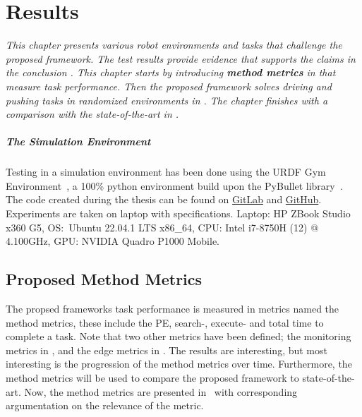 \chapter{Results}%
\label{chap:results}
\textit{This chapter presents various robot environments and tasks that challenge the proposed framework. The test results provide evidence that supports the claims in the conclusion . This chapter starts by introducing \textbf{method metrics} in  that measure task performance. Then the proposed framework solves driving and pushing tasks in randomized environments in . The chapter finishes with a comparison with the state-of-the-art in .\bs}

\paragraph{The Simulation Environment}
Testing in a simulation environment has been done using the URDF Gym Environment~\cite{spahn_urdfenvironment_2022}, a 100\% python environment build upon the PyBullet library~\cite{coumans_pybullet_2016}. The code created during the thesis can be found on \href{https://gitlab.tudelft.nl/airlab-delft/msc_projects/msc_gijs_groote}{GitLab} and \href{https://github.com/GijsGroote/semantic-thinking-robot}{GitHub}. Experiments are taken on laptop with specifications. Laptop: HP ZBook Studio x360 G5, OS:~Ubuntu 22.04.1 LTS x86\_64, CPU: Intel i7-8750H (12) @ 4.100GHz, GPU: NVIDIA Quadro P1000 Mobile.\bs

\section{Proposed Method Metrics}%
\label{sec:proposed_method_metrics}
The propsed frameworks task performance is measured in metrics named the method metrics, these include the \ac{PE}, search-, execute- and total time to complete a task. Note that two other metrics have been defined; the monitoring metrics in , and the edge metrics in . The results are interesting, but most interesting is the progression of the method metrics over time. Furthermore, the method metrics will be used to compare the proposed framework to state-of-the-art. Now, the method metrics are presented in~ with corresponding argumentation on the relevance of the metric.\bs

